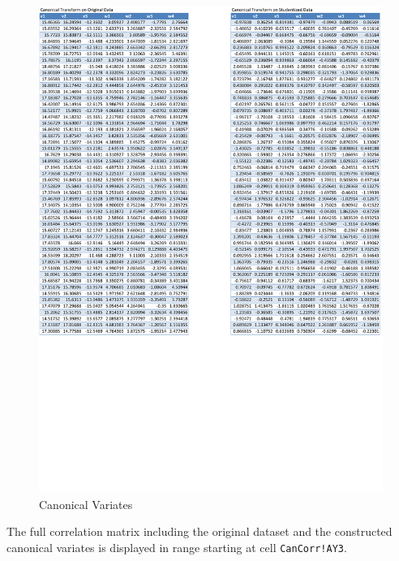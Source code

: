 \documentclass[article]{jss}
\begin{document}
        \begin{figure}[!tbh]
          \includegraphics[width=\linewidth, keepaspectratio=true]{img/CanCorrSheetCanCorrVariates}
          \centering{}\protect\caption{Canonical Variates}\label{fig:CanCorrSheetCanCorrVariates}
        \end{figure}
        The full correlation matrix including the original dataset and the constructed canonical variates is displayed in range starting at cell \texttt{CanCorr!AY3}.
\end{document}
